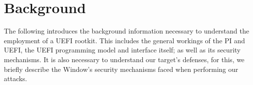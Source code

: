 
\chapter{Background}

The following introduces the background information necessary to understand the employment of a \ac{UEFI} rootkit. This includes the general workings of the \acf{PI} and \ac{UEFI}, the \ac{UEFI} programming model and interface itself; as well as its security mechanisms. It is also necessary to understand our target's defenses, for this, we briefly describe the Window's security mechanisms faced when performing our attacks.





